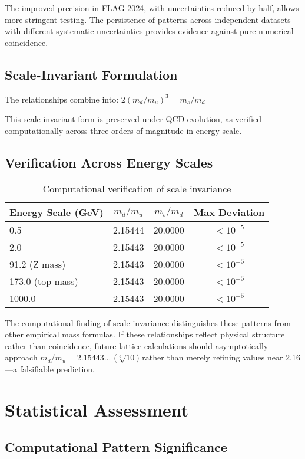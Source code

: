 \documentclass[12pt]{article}
\begin{document}
The improved precision in FLAG 2024, with uncertainties reduced by half, allows more stringent testing. The persistence of patterns across independent datasets with different systematic uncertainties provides evidence against pure numerical coincidence.

\subsection{Scale-Invariant Formulation}

The relationships combine into: $2(m_d/m_u)^3 = m_s/m_d$

This scale-invariant form is preserved under QCD evolution, as verified computationally across three orders of magnitude in energy scale.

\subsection{Verification Across Energy Scales}

\begin{table}[h!]
\centering
\caption{Computational verification of scale invariance}
\begin{tabular}{lccc}
\toprule
Energy Scale (GeV) & $m_d/m_u$ & $m_s/m_d$ & Max Deviation \\
\midrule
0.5 & 2.15444 & 20.0000 & $<10^{-5}$ \\
2.0 & 2.15443 & 20.0000 & $<10^{-5}$ \\
91.2 (Z mass) & 2.15443 & 20.0000 & $<10^{-5}$ \\
173.0 (top mass) & 2.15443 & 20.0000 & $<10^{-5}$ \\
1000.0 & 2.15443 & 20.0000 & $<10^{-5}$ \\
\bottomrule
\end{tabular}
\end{table}

The computational finding of scale invariance distinguishes these patterns from other empirical mass formulas. If these relationships reflect physical structure rather than coincidence, future lattice calculations should asymptotically approach $m_d/m_u = 2.15443...$ ($\sqrt[3]{10}$) rather than merely refining values near 2.16—a falsifiable prediction.

\section{Statistical Assessment}

\subsection{Computational Pattern Significance}
\end{document}
